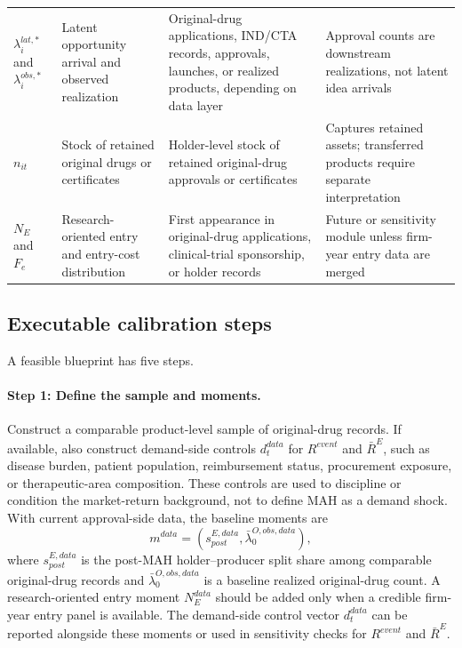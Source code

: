 \documentclass[12pt]{article}
\newcommand{\1}{\mathbf{1}}
\begin{document}
\begin{table}[htbp]
\begin{tabularx}{\textwidth}{@{}L{0.17\textwidth}L{0.25\textwidth}L{0.24\textwidth}Y@{}}
$\lambda_i^{lat,*}$ and $\lambda_i^{obs,*}$ & Latent opportunity arrival and observed realization & Original-drug applications, IND/CTA records, approvals, launches, or realized products, depending on data layer & Approval counts are downstream realizations, not latent idea arrivals \\
$n_{it}$ & Stock of retained original drugs or certificates & Holder-level stock of retained original-drug approvals or certificates & Captures retained assets; transferred products require separate interpretation \\
$N_E$ and $F_e$ & Research-oriented entry and entry-cost distribution & First appearance in original-drug applications, clinical-trial sponsorship, or holder records & Future or sensitivity module unless firm-year entry data are merged \\
\bottomrule
\end{tabularx}
\end{table}

\subsection{Executable calibration steps}

A feasible blueprint has five steps.

\paragraph{Step 1: Define the sample and moments.}
Construct a comparable product-level sample of original-drug records. If available, also construct demand-side controls $d_t^{data}$ for $R^{event}$ and $\bar R^E$, such as disease burden, patient population, reimbursement status, procurement exposure, or therapeutic-area composition. These controls are used to discipline or condition the market-return background, not to define MAH as a demand shock. With current approval-side data, the baseline moments are
\[
m^{data}
=
\left(
s^{E,data}_{post},
\bar\lambda^{O,obs,data}_{0}
\right),
\]
where $s^{E,data}_{post}$ is the post-MAH holder--producer split share among comparable original-drug records and $\bar\lambda^{O,obs,data}_{0}$ is a baseline realized original-drug count. A research-oriented entry moment $N_E^{data}$ should be added only when a credible firm-year entry panel is available. The demand-side control vector $d_t^{data}$ can be reported alongside these moments or used in sensitivity checks for $R^{event}$ and $\bar R^E$.
\end{document}

